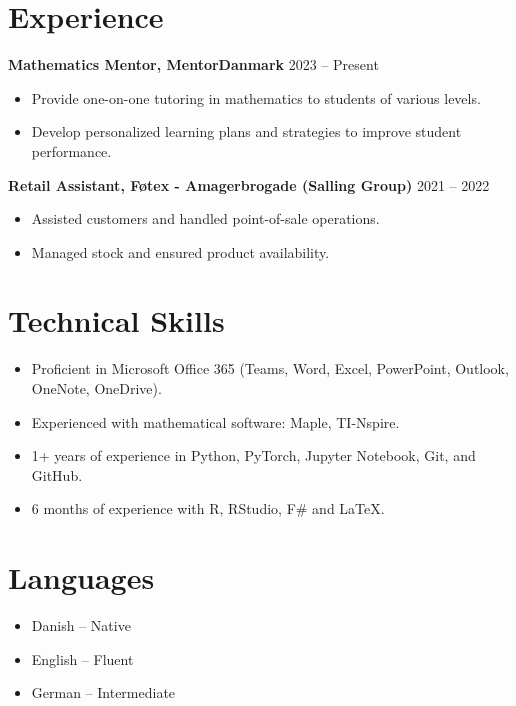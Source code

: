 \documentclass[a4paper,10pt]{article}
\begin{document}
\section*{Experience}
\textbf{Mathematics Mentor, MentorDanmark} \hfill 2023 -- Present 
\begin{itemize}[noitemsep, topsep=0pt]
    \item Provide one-on-one tutoring in mathematics to students of various levels.
    \item Develop personalized learning plans and strategies to improve student performance.
\end{itemize}
\n
\textbf{Retail Assistant, F\o tex - Amagerbrogade (Salling Group)} \hfill 2021 -- 2022 
\begin{itemize}[noitemsep, topsep=0pt]
    \item Assisted customers and handled point-of-sale operations.
    \item Managed stock and ensured product availability.
\end{itemize}
\n
\section*{Technical Skills}
\begin{itemize}[noitemsep, topsep=0pt]
    \item Proficient in Microsoft Office 365 (Teams, Word, Excel, PowerPoint, Outlook, OneNote, OneDrive).
    \item Experienced with mathematical software: Maple, TI-Nspire.
    \item 1+ years of experience in Python, PyTorch, Jupyter Notebook, Git, and GitHub.
    \item 6 months of experience with R, RStudio, F\# and \LaTeX.
\end{itemize}

\section*{Languages}
\begin{itemize}[noitemsep, topsep=0pt]
    \item Danish -- Native
    \item English -- Fluent
    \item German -- Intermediate
\end{itemize}
\end{document}
